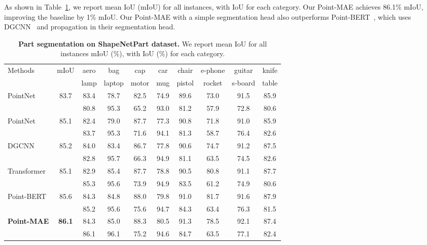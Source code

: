 \documentclass[runningheads]{llncs}
\begin{document}
As shown in Table~\ref{tb:seg}, we report mean IoU (mIoU) for all instances, with IoU for each category. Our Point-MAE achieves 86.1\% mIoU, improving the baseline by 1\% mIoU. Our Point-MAE with a simple segmentation head also outperforms Point-BERT~\cite{pointbert}, which uses DGCNN~\cite{ptdgcnn} and propagation in their segmentation head.

\begin{table}
\vspace{-2mm}
\begin{center}
\caption{{\bf Part segmentation on ShapeNetPart dataset.} We report mean IoU for all instances mIoU (\%), with IoU (\%) for each category. }

\label{tb:seg}
\begin{tabular}{lc|cccccccc}
\hline
Methods  & mIoU & aero & bag& cap& car& chair &e-phone&guitar &knife\\ 
 & &lamp &laptop &motor&mug&pistol&rocket&s-board&table  \\
\hline

 PointNet~\cite{pointnet} & 83.7 & 83.4 & 78.7 & 82.5 & 74.9 & 89.6 & 73.0 & 91.5 & 85.9 \\
                &      & 80.8 & 95.3 & 65.2 & 93.0 & 81.2 & 57.9 & 72.8 & 80.6 \\

 PointNet~\cite{pointnet++} & 85.1 & 82.4 & 79.0 & 87.7 & 77.3 & 90.8 & 71.8 & 91.0 & 85.9 \\
                &      & 83.7 & 95.3 & 71.6 & 94.1 & 81.3 & 58.7 & 76.4 & 82.6 \\

 DGCNN~\cite{ptdgcnn} & 85.2 & 84.0 & 83.4 & 86.7 & 77.8 & 90.6 & 74.7 & 91.2 & 87.5 \\
                &      & 82.8 & 95.7 & 66.3 & 94.9 & 81.1 & 63.5 & 74.5 & 82.6 \\

\hline
 Transformer~\cite{pointbert} & 85.1 & 82.9 & 85.4 & 87.7 & 78.8 & 90.5 & 80.8 & 91.1 & 87.7 \\
                &      & 85.3 & 95.6 & 73.9 & 94.9 & 83.5 & 61.2 & 74.9 & 80.6 \\
 Point-BERT~\cite{pointbert} & 85.6 & 84.3 & 84.8 & 88.0 & 79.8 & 91.0 & 81.7 & 91.6 & 87.9 \\
                &      & 85.2 & 95.6 & 75.6 & 94.7 & 84.3 & 63.4 & 76.3 & 81.5 \\
 {\bf Point-MAE} & {\bf 86.1} & 84.3 & 85.0 & 88.3 & 80.5 & 91.3 & 78.5 & 92.1 & 87.4 \\
                 &      & 86.1 & 96.1 & 75.2 & 94.6 & 84.7 & 63.5 & 77.1 & 82.4 \\
\hline
\end{tabular}
\end{center}
\vspace{-8mm}
\end{table}
\end{document}
